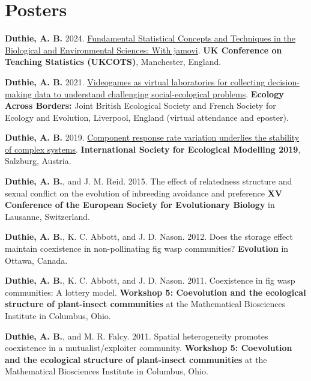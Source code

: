 \documentclass[letterpaper]{article}
\renewenvironment{itemize}{
  \begin{list}{}{
    \setlength{\leftmargin}{1.5em}
  }
}{
  \end{list}
}
\begin{document}
\section*{Posters}
\begin{itemize}
\item {\bf Duthie, A. B.} 2024. \href{http://bradduthie.github.io/posters/duthie_UKCOTS_2024.pdf}{Fundamental Statistical Concepts and Techniques in the Biological and Environmental Sciences: With jamovi}. {\bf UK Conference on Teaching Statistics (UKCOTS)}, Manchester, England.
\item {\bf Duthie, A. B.} 2021. \href{http://bradduthie.github.io/posters/duthie_BES_2021.pdf}{Videogames as virtual laboratories for collecting decision-making data to understand challenging social-ecological problems}. {\bf Ecology Across Borders:} Joint British Ecological Society and French Society for Ecology and Evolution, Liverpool, England (virtual attendance and eposter).
\item {\bf Duthie, A. B.} 2019. \href{http://bradduthie.github.io/posters/duthie_ISEM_2019.pdf}{Component response rate variation underlies the stability of complex systems}. {\bf International Society for Ecological Modelling 2019}, Salzburg, Austria.
\item {\bf Duthie, A. B.}, and J. M. Reid. 2015. The effect of relatedness structure and sexual conflict on the evolution of inbreeding avoidance and preference {\bf XV Conference of the European Society for Evolutionary Biology} in Lausanne, Switzerland.
\item {\bf Duthie, A. B.}, K. C. Abbott, and J. D. Nason. 2012. Does the storage effect maintain coexistence in non-pollinating fig wasp communities? {\bf Evolution} in Ottawa, Canada.
\item {\bf Duthie, A. B.}, K. C. Abbott, and J. D. Nason. 2011. Coexistence in fig wasp communities: A lottery model. {\bf Workshop 5: Coevolution and the ecological structure of plant-insect communities} at the Mathematical Biosciences Institute in Columbus, Ohio.
\item {\bf Duthie, A. B.}, and M. R. Falcy. 2011. Spatial heterogeneity promotes coexistence in a mutualist/exploiter community. {\bf Workshop 5: Coevolution and the ecological structure of plant-insect communities} at the Mathematical Biosciences Institute in Columbus, Ohio.
\end{itemize}
\end{document}
